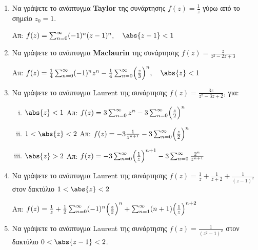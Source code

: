 


\geometry{top=2cm}

\everymath{\displaystyle}
\pagestyle{askhseis}



\begin{center}
  \minibox{\large\bfseries  \textcolor{Col1}{Ασκήσεις στις σειρές Laurent}}
\end{center}

\vspace{\baselineskip} 

\begin{enumerate}
  \item Να γράψετε το ανάπτυγμα \textbf{Taylor} της συνάρτησης $f(z)=\frac{1}{z}$ 
    γύρω από το σημείο $z_0=1$. 

    \hfill Απ: $f(z)=\sum_{n=0}^{\infty}(-1)^n(z-1)^n, \quad \abs{z-1}<1$

  \item Να γράψετε το ανάπτυγμα \textbf{Maclaurin} της συνάρτησης 
    $f(z)=\frac{z}{z^2-2z+3}$

    \hfill Απ: $f(z)=\frac{1}{4}\sum_{n=0}^{\infty}(-1)^nz^n-\frac{1}{4}\sum_{n=0}
    ^{\infty}\Bigl(\frac{z}{3}\Bigr)^n, \quad \abs{z}<1$

  \item Να γράψετε το ανάπτυγμα Laurent της συνάρτησης $f(z)=\frac{3z}{z^2-3z+2}$, για: 

    \begin{enumerate}[i)]
      \item $\abs{z}<1\hfill$  Απ: $f(z)=3\sum_{n=0}^{\infty}z^n-3\sum_{n=0}^{\infty}
        \Bigl(\frac{z}{2}\Bigr)^n$ \item $1<\abs{z}<2$
        \hfill Απ: $f(z)=-3\frac{1}{z^{n+1}}-3\sum_{n=0}^{\infty}
        \Bigl(\frac{z}{2}\Bigr)^n$ \item $\abs{z}>2$
        \hfill Απ: $f(z)=-3\sum_{n=0}^{\infty}\Bigl(\frac{1}{z}\Bigr)^{n+1}-3
        \sum_{n=0}^{\infty}\frac{2^n}{z^{n+1}}$ 
    \end{enumerate}

  \item Να γράψετε το ανάπτυγμα Laurent της συνάρτησης 
    $f(z)=\frac{1}{z}+\frac{1}{z+2}+\frac{1}{(z-1)^2}$ στον δακτύλιο $1<\abs{z}<2$

    \hfill Απ: $f(z)=\frac{1}{z}+\frac{1}{2}\sum_{n=0}^{\infty}(-1)^n
    \Bigl(\frac{z}{2}\Bigr)^n+\sum_{n=1}^{\infty}(n+1)\Bigl(\frac{1}{z}\Bigr)^{n+2}$

  \item Να γράψετε το ανάπτυγμα Laurent της συνάρτησης $f(z)=\frac{1}{(z^2-1)^2}$ στον 
    δακτύλιο $0<\abs{z-1}<2$.


\end{enumerate}
